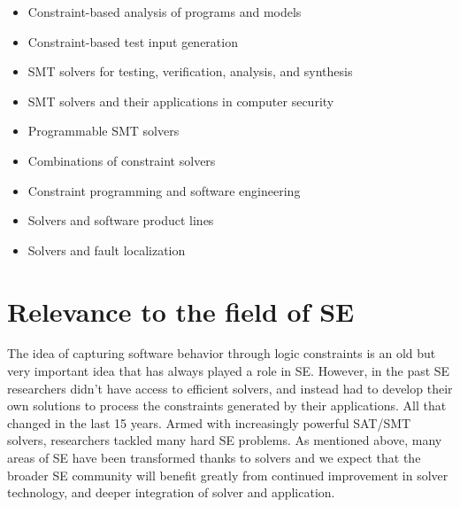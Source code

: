 \documentclass{sig-alternate}
\begin{document}
\begin{itemize}
\item Constraint-based analysis of programs and models
\item Constraint-based test input generation
\item SMT solvers for testing, verification, analysis, and synthesis
\item SMT solvers and their applications in computer security
\item Programmable SMT solvers
\item Combinations of constraint solvers
\item Constraint programming and software engineering
\item Solvers and software product lines
\item Solvers and fault localization
\end{itemize}

\section{Relevance to the field of SE}
\vspace{0.2cm} The idea of capturing software behavior through logic
constraints is an old but very important idea that has always played a
role in SE.  However, in the past SE researchers didn't have access to
efficient solvers, and instead had to develop their own solutions to
process the constraints generated by their applications. All that
changed in the last 15 years. Armed with increasingly powerful SAT/SMT
solvers, researchers tackled many hard SE problems. As mentioned
above, many areas of SE have been transformed thanks to solvers and we
expect that the broader SE community will benefit greatly from
continued improvement in solver technology, and deeper integration of
solver and application.
\end{document}
